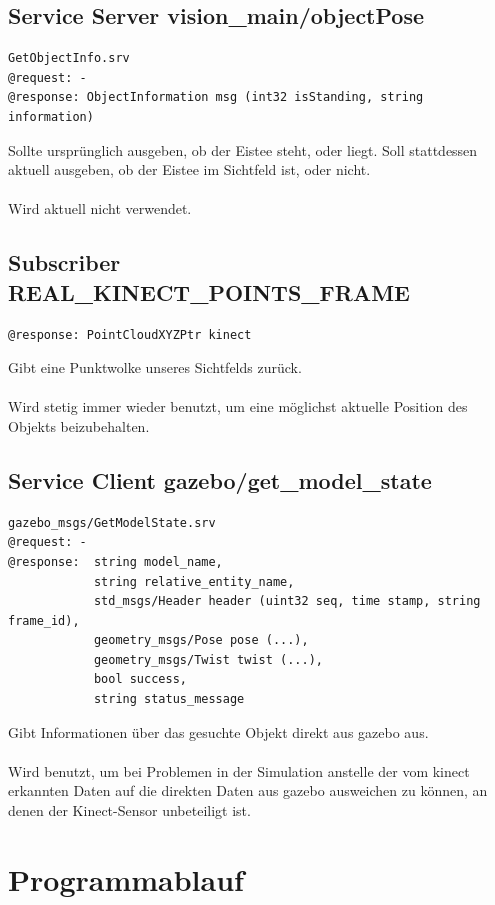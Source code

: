 \documentclass{suturo}
\begin{document}
\subsection*{Service Server vision\_main/objectPose}
\begin{verbatim}
GetObjectInfo.srv
@request: -
@response: ObjectInformation msg (int32 isStanding, string information)
\end{verbatim}
Sollte ursprünglich ausgeben, ob der Eistee steht, oder liegt. Soll stattdessen aktuell ausgeben, ob der Eistee im Sichtfeld ist, oder nicht.
\\ \\
Wird aktuell nicht verwendet.

\subsection*{Subscriber REAL\_KINECT\_POINTS\_FRAME}
\begin{verbatim}
@response: PointCloudXYZPtr kinect
\end{verbatim}
Gibt eine Punktwolke unseres Sichtfelds zurück.
\\ \\
Wird stetig immer wieder benutzt, um eine möglichst aktuelle Position des Objekts beizubehalten.

\subsection*{Service Client gazebo/get\_model\_state}
\begin{verbatim}
gazebo_msgs/GetModelState.srv
@request: -
@response:  string model_name,
            string relative_entity_name,
            std_msgs/Header header (uint32 seq, time stamp, string frame_id),
            geometry_msgs/Pose pose (...),
            geometry_msgs/Twist twist (...),
            bool success,
            string status_message
\end{verbatim}
Gibt Informationen über das gesuchte Objekt direkt aus gazebo aus.
\\ \\
Wird benutzt, um bei Problemen in der Simulation anstelle der vom kinect erkannten Daten auf die direkten Daten aus gazebo ausweichen zu können, an denen der Kinect-Sensor unbeteiligt ist.

\section*{Programmablauf}
\end{document}
